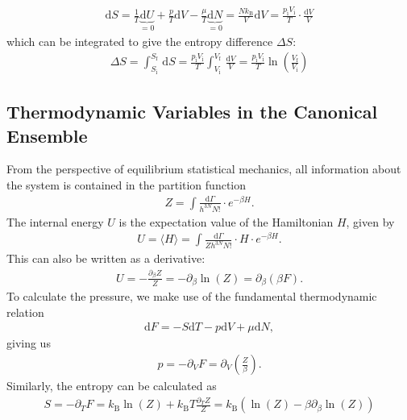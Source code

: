 \documentclass[a4paper,10pt,bibtotoc]{scrartcl}
\begin{document}
\begin{align}
 \mathrm{d}S = \frac{1}{T}\underbrace{\mathrm{d}U}_{=0} + \frac{p}{T}\mathrm{d}V - \frac{\mu}{T}\underbrace{\mathrm{d}N}_{=0} = \frac{Nk_\mathrm{B}}{V}\mathrm{d}V = \frac{p_\mathrm{i} V_\mathrm{i}}{T}\cdot\frac{\mathrm{d}V}{V}
\end{align}
which can be integrated to give the entropy difference $\Delta S$:
\begin{align}
 \Delta S = \int_{S_\mathrm{i}}^{S_\mathrm{f}}\,\mathrm{d}S = \frac{p_\mathrm{i} V_\mathrm{i}}{T}\int_{V_\mathrm{i}}^{V_\mathrm{f}}\,\frac{\mathrm{d} V}{V} = \frac{p_\mathrm{i} V_\mathrm{i}}{T}\ln\left(\frac{V_\mathrm{f}}{V_\mathrm{i}}\right)
\end{align}





\subsection{Thermodynamic Variables in the Canonical Ensemble}
From the perspective of equilibrium statistical mechanics, all information about the system is contained in the partition function 
\begin{align}
 Z = \int\frac{\mathrm{d}\Gamma}{h^{3N}N!}\cdot e^{-\beta H}.
\end{align}
The internal energy $U$ is the expectation value of the Hamiltonian $H$, given by
\begin{align}
 U = \langle H\rangle = \int\frac{\mathrm{d}\Gamma}{Zh^{3N}N!}\cdot H\cdot e^{-\beta H}.
\end{align}
This can also be written as a derivative:
\begin{align}
 U = -\frac{\partial_\beta Z}{Z} =-\partial_\beta\ln\left(Z\right) = \partial_\beta\left(\beta F\right).
\end{align}
To calculate the pressure, we make use of the fundamental thermodynamic relation
\begin{align}
 \mathrm{d}F = -S\mathrm{d}T - p\mathrm{d}V + \mu\mathrm{d}N,
\end{align}
giving us
\begin{align}
p = -\partial_V F = \partial_V\left(\frac{Z}{\beta}\right).
\end{align}
Similarly, the entropy can be calculated as
\begin{align}
 S = -\partial_T F = k_\mathrm{B}\ln\left( Z\right) + k_\mathrm{B}T \frac{\partial_T Z}{Z} = k_\mathrm{B}\left(\ln\left( Z\right)  -\beta \partial_\beta \ln\left(Z\right)\right)
\end{align}
\end{document}
